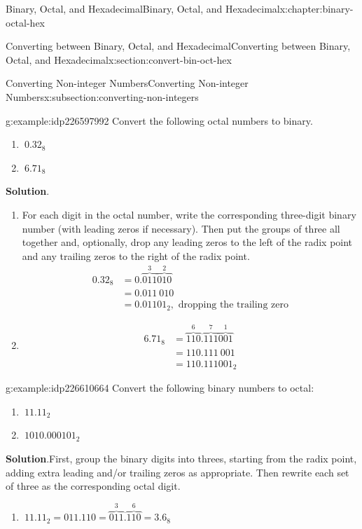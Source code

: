 \documentclass[twoside,10pt,]{book}
\newcommand{\blocktitlefont}{\relax}
\numberwithin{equation}{section}
\newcommand{\amp}{&}
\begin{document}
\begin{chapterptx}{Binary, Octal, and Hexadecimal}{}{Binary, Octal, and Hexadecimal}{}{}{x:chapter:binary-octal-hex}
\begin{sectionptx}{Converting between Binary, Octal, and Hexadecimal}{}{Converting between Binary, Octal, and Hexadecimal}{}{}{x:section:convert-bin-oct-hex}
\begin{subsectionptx}{Converting Non-integer Numbers}{}{Converting Non-integer Numbers}{}{}{x:subsection:converting-non-integers}
\begin{example}{}{g:example:idp226597992}
Convert the following octal numbers to binary. %
\begin{enumerate}
\item{}\(\displaystyle \ 0.32_8\)%
\item{}\(\displaystyle \ 6.71_8\)%
\end{enumerate}
\par\smallskip%
\noindent\textbf{\blocktitlefont Solution}.\label{g:solution:idp226610920}{}\hypertarget{g:solution:idp226610920}{}\quad{}%
\begin{enumerate}
\item{}For each digit in the octal number, write the corresponding three-digit binary number (with leading zeros if necessary).  Then put the groups of three all together and, optionally, drop any leading zeros to the left of the radix point and any trailing zeros to the right of the radix point.%
%
\begin{align*}
0.32_8 \amp = 0.\overbrace{011}^3\overbrace{010}^2\\
\amp = 0.011\ 010\\
\amp = 0.01101_2,\text{ dropping the trailing zero}
\end{align*}
\item{}%
\begin{align*}
6.71_8 \amp = \overbrace{110}^6.\overbrace{111}^7\overbrace{001}^1\\
\amp = 110.111\ 001\\
\amp = 110.111001_2
\end{align*}
%
\end{enumerate}
\end{example}
\begin{example}{}{g:example:idp226610664}%
Convert the following binary numbers to octal: %
\begin{enumerate}
\item{}\(\displaystyle \ 11.11_2\)%
\item{}\(\displaystyle \ 1010.000101_2\)%
\end{enumerate}
\par\smallskip%
\noindent\textbf{\blocktitlefont Solution}.\label{g:solution:idp226613224}{}\hypertarget{g:solution:idp226613224}{}\quad{}First, group the binary digits into threes, starting from the radix point, adding extra leading and\slash{}or trailing zeros as appropriate.  Then rewrite each set of three as the corresponding octal digit.%
%
\begin{enumerate}
\item{}\(\displaystyle \ 11.11_2 = 011.110=\overbrace{011}^3.\overbrace{110}^6=3.6_8\)%

\end{enumerate}
\end{example}
\end{subsectionptx}
\end{sectionptx}
\end{chapterptx}
\end{document}
